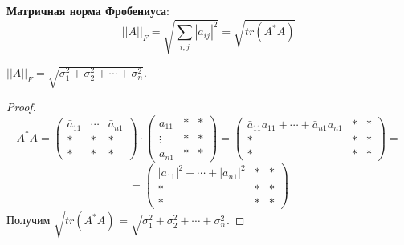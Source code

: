 \begin{definition}
    \textbf{Матричная норма Фробениуса}:
    $$||A||_F=\sqrt{\sum\limits_{i,j}|a_{ij}|^2}=\sqrt{tr(A^*A)}$$
\end{definition}
\begin{statement}
    $||A||_F = \sqrt{\sigma_1^2+\sigma_2^2+\cdots+\sigma_n^2}$.
\end{statement}
\begin{proof}
    \[A^*A=\begin{pmatrix}
    \bar a_{11} & \cdots & \bar a_{n1}\\
    * & * & *\\
    * & * & *
    \end{pmatrix} \cdot \begin{pmatrix}
    a_{11} & * & *\\
    \vdots & * & *\\
    a_{n1} & * & *
    \end{pmatrix} = \begin{pmatrix}
    \bar a_{11} a_{11}+\cdots+\bar a_{n1} a_{n1} & * & *\\
    * & * & *\\
    * & * & *
    \end{pmatrix}=\] \[=\begin{pmatrix}
    |a_{11}|^2+\cdots +|a_{n1}|^2 & * & *\\
    * & * & *\\
    * & * & *
    \end{pmatrix}\]
    Получим $\sqrt{tr(A^*A)}=\sqrt{\sigma_1^2+\sigma_2^2+\cdots+\sigma_n^2}$.
\end{proof}



